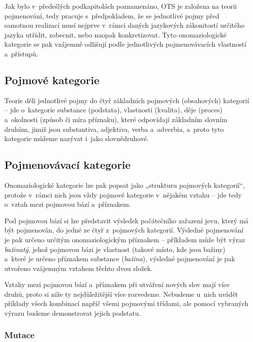 Jak bylo v~předešlých podkapitolách poznamenáno, OTS je založena na
teorii pojmenování, tedy pracuje s~předpokladem, že se jednotlivé pojmy
před samotnou realizací musí nejprve v~rámci daných jazykových
zákonitostí určitého jazyka utřídit, zobecnit, nebo naopak
konkretizovat. Tyto onomaziologické kategorie se pak vzájemně odlišují
podle jednotlivých pojmenovávacích vlastností a~přístupů.
\parencite[29]{dokulil62}

\hypertarget{pojmovuxe9-kategorie}{%
\subsection{Pojmové kategorie}\label{pojmovuxe9-kategorie}}

Teorie dělí jednotlivé pojmy do čtyř základních pojmových (obsahových)
kategorií -- jde o~kategorie substance (podstata), vlastnosti (kvalita),
děje (proces) a~okolnosti (způsob či míra příznaku), které odpovídají
základním slovním druhům, jimiž jsou substantiva, adjektiva, verba
a~adverbia, a~proto tyto kategorie můžeme nazývat i~jako slovnědruhové.
\parencite[102]{dokulil00}

\hypertarget{pojmenovuxe1vacuxed-kategorie}{%
\subsection{Pojmenovávací
kategorie}\label{pojmenovuxe1vacuxed-kategorie}}

Onomaziologické kategorie lze pak popsat jako „strukturu pojmových
kategorií``, protože v~rámci nich jsou vždy pojmové kategorie v~nějakém
vztahu -- jde tedy o~vztah mezi pojmovou bází a~příznakem.
\parencite{enc-onomaz-kateg17}

Pod pojmovou bází si lze představit výsledek počátečního zařazení jevu,
který má být pojmenován, do jedné ze čtyř z~pojmových kategorií.
Výsledné pojmenování je pak určeno určitým onomaziologickým příznakem --
příkladem může být výraz \emph{bažinatý}, jehož pojmovou bázi je
vlastnost (takové místo, kde jsou bažiny) a~které je určeno příznakem
substance (\emph{bažina}), výsledné pojmenování je pak utvořeno
vzájemným vztahem těchto dvou složek.~\parencite[29]{dokulil62}

Vztahy mezi pojmovou bází a~příznakem při utváření nových slov mají více
druhů, proto si níže ty nejdůležitější více rozvedeme. Nebudeme u~nich
uvádět příklady všech kombinací napříč všemi pojmovými třídami, ale
pomocí vybraných výrazu budeme demonstrovat jejich podstatu.

\hypertarget{mutace}{%
\subsubsection{Mutace}\label{mutace}}

